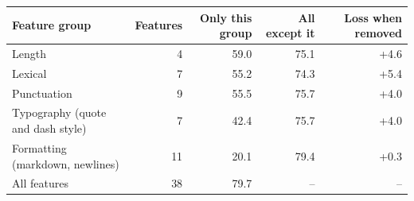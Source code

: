 \begin{tabular}{lrrrr}
\toprule
Feature group & Features & Only this group & All except it & Loss when removed \\
\midrule
Length & 4 & 59.0 & 75.1 & +4.6 \\
Lexical & 7 & 55.2 & 74.3 & +5.4 \\
Punctuation & 9 & 55.5 & 75.7 & +4.0 \\
Typography (quote and dash style) & 7 & 42.4 & 75.7 & +4.0 \\
Formatting (markdown, newlines) & 11 & 20.1 & 79.4 & +0.3 \\
\midrule
All features & 38 & 79.7 & -- & -- \\
\bottomrule
\end{tabular}
